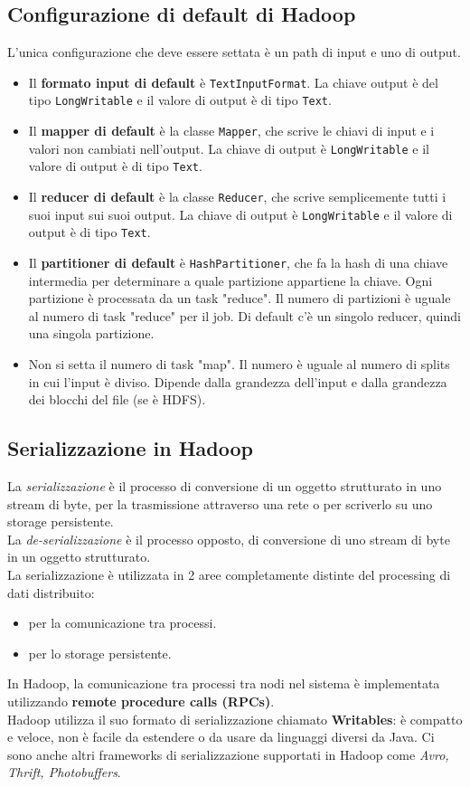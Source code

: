 \documentclass{article}
\begin{document}
\begin{appendices}
\subsection{Configurazione di default di Hadoop}
L'unica configurazione che deve essere settata è un path di input e uno di output. 
\begin{itemize}
    \item Il \textbf{formato input di default} è \texttt{TextInputFormat}. La chiave output è del tipo \texttt{LongWritable} e il valore di output è di tipo \texttt{Text}.
    \item Il \textbf{mapper di default} è la classe \texttt{Mapper}, che scrive le chiavi di input e i valori non cambiati nell'output. La chiave di output è \texttt{LongWritable} e il valore di output è di tipo \texttt{Text}.
    \item Il \textbf{reducer di default} è la classe \texttt{Reducer}, che scrive semplicemente tutti i suoi input sui suoi output.  La chiave di output è \texttt{LongWritable} e il valore di output è di tipo \texttt{Text}.
    \item Il \textbf{partitioner di default} è \texttt{HashPartitioner}, che fa la hash di una chiave intermedia per determinare a quale partizione appartiene la chiave. Ogni partizione è processata da un task "reduce". Il numero di partizioni è uguale al numero di task "reduce" per il job. Di default c'è un singolo reducer, quindi una singola partizione.
    \item Non si setta il numero di task "map". Il numero è uguale al numero di splits in cui l'input è diviso. Dipende dalla grandezza dell'input e dalla grandezza dei blocchi del file (se è HDFS).
\end{itemize}

\subsection{Serializzazione in Hadoop}
La \textit{serializzazione} è il processo di conversione di un oggetto strutturato in uno stream di byte, per la trasmissione attraverso una rete o per scriverlo su uno storage persistente. \\
La \textit{de-serializzazione} è il processo opposto, di conversione di uno stream di byte in un oggetto strutturato. \\
La serializzazione è utilizzata in 2 aree completamente distinte del processing di dati distribuito:
\begin{itemize}
    \item per la comunicazione tra processi.
    \item per lo storage persistente.
\end{itemize}
In Hadoop, la comunicazione tra processi tra nodi nel sistema è implementata utilizzando \textbf{remote procedure calls (RPCs)}. \\ 
Hadoop utilizza il suo formato di serializzazione chiamato \textbf{Writables}: è compatto e veloce, non è facile da estendere o da usare da linguaggi diversi da Java. Ci sono anche altri frameworks di serializzazione supportati in Hadoop come \textit{Avro, Thrift, Photobuffers}.


\end{appendices}
\end{document}
